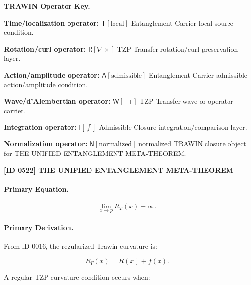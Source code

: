 \par\vspace{0.45\baselineskip}
\noindent\begin{minipage}[t]{\linewidth}
\begingroup
\small
\raggedright
\textbf{TRAWIN Operator Key.}\par
\noindent\textbf{Time/localization operator:} $\mathsf{T}\!\left[\mathrm{local}\right]$ Entanglement Carrier local source condition.\par
\noindent\textbf{Rotation/curl operator:} $\mathsf{R}\!\left[\nabla\times\right]$ TZP Transfer rotation/curl preservation layer.\par
\noindent\textbf{Action/amplitude operator:} $\mathsf{A}\!\left[\mathrm{admissible}\right]$ Entanglement Carrier admissible action/amplitude condition.\par
\noindent\textbf{Wave/d'Alembertian operator:} $\mathsf{W}\!\left[\Box\right]$ TZP Transfer wave or operator carrier.\par
\noindent\textbf{Integration operator:} $\mathsf{I}\!\left[\int\right]$ Admissible Closure integration/comparison layer.\par
\noindent\textbf{Normalization operator:} $\mathsf{N}\!\left[\mathrm{normalized}\right]$ normalized TRAWIN closure object for THE UNIFIED ENTANGLEMENT META-THEOREM.\par
\endgroup
\end{minipage}

\clearpage
\noindent\textbf{[ID 0522] THE UNIFIED ENTANGLEMENT META-THEOREM}\par
\vspace{0.35em}
\paragraph{Primary Equation.}
\begin{equation}
\lim_{x\to p}R_T(x)=\infty .
\end{equation}

\paragraph{Primary Derivation.}
From ID 0016, the regularized Trawin curvature is:

\begin{equation}
R_T(x)=R(x)+f(x).
\end{equation}

A regular TZP curvature condition occurs when:

